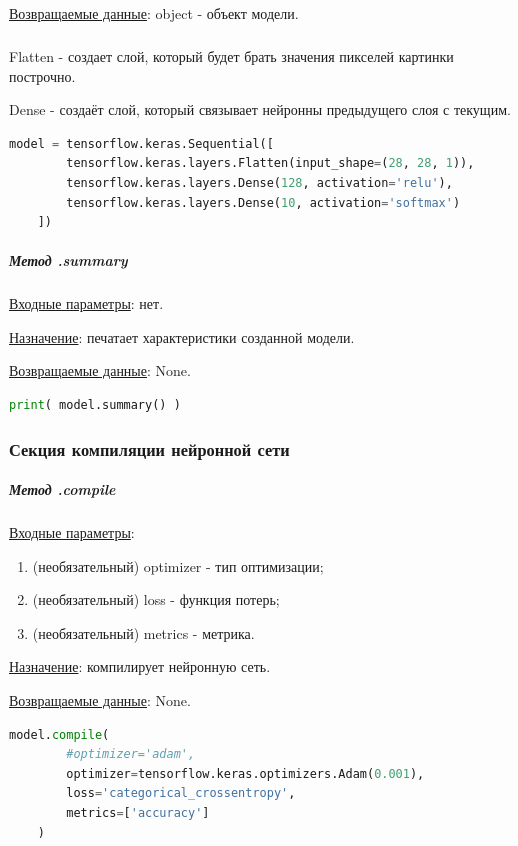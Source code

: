 \underline{Возвращаемые данные}: object - объект модели.

\subparagraph{} \hspace{0pt}

Flatten - создает слой, который будет брать значения пикселей картинки построчно.

Dense - создаёт слой, который связывает нейронны предыдущего слоя с текущим.

\begin{lstlisting}[language=Python,]
    model = tensorflow.keras.Sequential([
        tensorflow.keras.layers.Flatten(input_shape=(28, 28, 1)),
        tensorflow.keras.layers.Dense(128, activation='relu'),
        tensorflow.keras.layers.Dense(10, activation='softmax')
    ])
\end{lstlisting}

\subparagraph{Метод .summary} \hspace{0pt}

\underline{Входные параметры}: нет.

\underline{Назначение}: печатает характеристики созданной модели.

\underline{Возвращаемые данные}: None.


\begin{lstlisting}[language=Python,]
    print( model.summary() )
\end{lstlisting}



\subsubsection{Секция компиляции нейронной сети}

\subparagraph{Метод .compile} \hspace{0pt}

\underline{Входные параметры}:
\begin{enumerate}
    \item (необязательный) optimizer - тип оптимизации;
    \item (необязательный) loss - функция потерь;
    \item (необязательный) metrics - метрика.
\end{enumerate}

\underline{Назначение}: компилирует нейронную сеть.

\underline{Возвращаемые данные}: None.

\begin{lstlisting}[language=Python,]
    model.compile(
        #optimizer='adam',
        optimizer=tensorflow.keras.optimizers.Adam(0.001),
        loss='categorical_crossentropy',
        metrics=['accuracy']
    )
\end{lstlisting}



